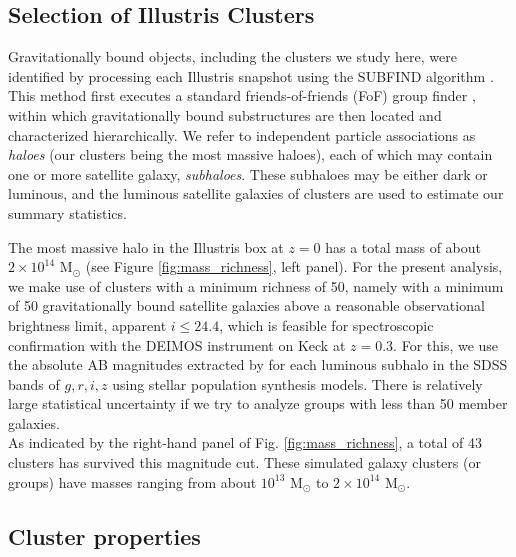\documentclass[usenatbib]{mn2e}
\begin{document}
{\subsection{Selection of Illustris Clusters}

Gravitationally bound objects, including the clusters we study here, were identified by processing each Illustris snapshot using the SUBFIND algorithm \citep{Springel:2001, Dolag:2009}. This method first executes a standard friends-of-friends (FoF) group finder \citep{Davis1985}, within which gravitationally bound substructures are then located and characterized hierarchically. We refer to independent particle associations as \textit{haloes} (our clusters being the most massive haloes), each of which may contain one or more satellite galaxy, \textit{subhaloes}. These subhaloes may be either dark or luminous, and the luminous satellite galaxies of clusters are used to estimate our summary statistics.

The most massive halo in the Illustris box at $z=0$ has a total mass of about $2\times10^{14}$ M$_\odot$ (see Figure \ref{fig:mass_richness}, left panel). For the present analysis, we make use of clusters with a minimum richness of 50, namely with a minimum of 50 gravitationally bound satellite galaxies above a reasonable observational brightness limit, apparent $i \leq 24.4$, which is feasible for spectroscopic confirmation with the DEIMOS instrument on Keck at $z=0.3$.
%
For this, we use the absolute AB magnitudes extracted by \cite{Vogelsberger2014} for each luminous subhalo in
the SDSS bands of $g, r, i, z$ using stellar population synthesis models.
There is relatively large statistical uncertainty if we try
to analyze groups with less than 50 member galaxies. \\

As indicated by the right-hand panel of Fig. \ref{fig:mass_richness}, 
a total of 43 clusters has survived this magnitude cut. These simulated galaxy clusters (or groups) have 
masses ranging from about $10^{13}$ M$_\odot $ to $2 \times 10^{14}$ M$_\odot$.

\subsection{Cluster properties}
\label{subsec:cluster_properties}

}
\end{document}
